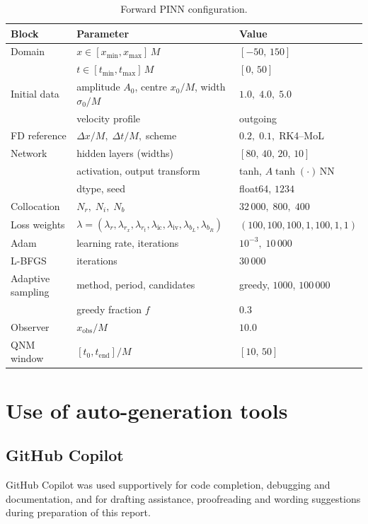 \documentclass[11pt,a4paper]{article}
\newcommand{\tend}{t_{\mathrm{end}}}
\theoremstyle{definition}
\begin{document}
\begin{table}[!htbp]
\centering
\caption{Forward PINN configuration.}
\label{tab:fwd-hyper}
\footnotesize
\begin{tabular}{lll}
\hline
Block & Parameter & Value \\
\hline
Domain
  & $x \in [x_{\min}, x_{\max}]\,M$ & $[-50,\,150]$ \\
  & $t \in [t_{\min}, t_{\max}]\,M$ & $[0,\,50]$ \\
Initial data
  & amplitude $A_0$, centre $x_0/M$, width $\sigma_0/M$
  & $1.0,\;4.0,\;5.0$ \\
  & velocity profile & outgoing \\
FD reference
  & $\Delta x/M,\;\Delta t/M,\;$scheme
  & $0.2,\;0.1,\;$RK4--MoL \\
Network
  & hidden layers (widths)            & $[80,\,40,\,20,\,10]$ \\
  & activation, output transform      & tanh, $A\tanh(\cdot)\,\mathrm{NN}$ \\
  & dtype, seed                       & float64, $1234$ \\
Collocation
  & $N_r,\;N_i,\;N_b$ & $32\,000,\;800,\;400$ \\
Loss weights
  & $\lambda = (\lambda_r,\lambda_{r_x},\lambda_{r_t},
              \lambda_{\mathrm{ic}},\lambda_{\mathrm{iv}},
              \lambda_{b_L},\lambda_{b_R})$
  & $(100,100,100,1,100,1,1)$ \\
Adam
  & learning rate, iterations        & $10^{-3},\;10\,000$ \\
L-BFGS
  & iterations                       & $30\,000$ \\
Adaptive sampling
  & method, period, candidates       & greedy, $1000$, $100\,000$ \\
  & greedy fraction $f$              & $0.3$ \\
Observer
  & $x_{\mathrm{obs}}/M$             & $10.0$ \\
QNM window
  & $[t_{0},\tend]/M$ & $[10,\,50]$ \\
\hline
\end{tabular}
\end{table}

\clearpage
\section{Use of auto-generation tools}\label{app:autogen}

\subsection{GitHub Copilot}
GitHub Copilot was used supportively for code completion, debugging
and documentation, and for drafting assistance, proofreading and
wording suggestions during preparation of this report.
\end{document}
